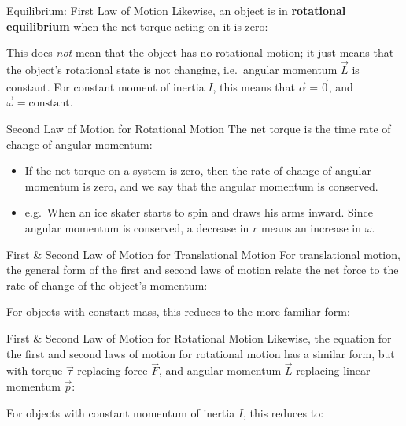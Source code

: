 \documentclass[12pt,compress,aspectratio=169]{beamer}
\begin{document}
\begin{frame}{Equilibrium: First Law of Motion}
  Likewise, an object is in \textbf{rotational equilibrium} when the net torque
  acting on it is zero:

  
  This does \emph{not} mean that the object has no rotational motion; it just
  means that the object's rotational state is not changing, i.e.\
  angular momentum $\vec L$ is constant. For constant moment of inertia $I$,
  this means that $\vec\alpha=\vec 0$, and $\vec\omega=\text{constant}$.
\end{frame}



\begin{frame}{Second Law of Motion for Rotational Motion}
  The net torque is the time rate of change of angular momentum:

  \begin{itemize}
  \item If the net torque on a system is zero, then the rate of change
    of angular momentum is zero, and we say that the angular momentum is
    conserved. 
  \item e.g.\ When an ice skater starts to spin and draws his arms inward.
    Since angular momentum is conserved, a decrease in $r$ means an
    increase in $\omega$.
  \end{itemize}
\end{frame}



\begin{frame}{First \& Second Law of Motion for Translational Motion}
  For translational motion, the general form of the first and second laws of
  motion relate the net force to the rate of change of the object's momentum:


  For objects with constant mass, this reduces to the more familiar form:

\end{frame}



\begin{frame}{First \& Second Law of Motion for Rotational Motion}
  Likewise, the equation for the first and second laws of motion for rotational
  motion has a similar form, but with torque $\vec\tau$ replacing force
  $\vec F$, and angular momentum $\vec L$ replacing linear momentum $\vec p$:


  For objects with constant momentum of inertia $I$, this reduces to:

\end{frame}
\end{document}
